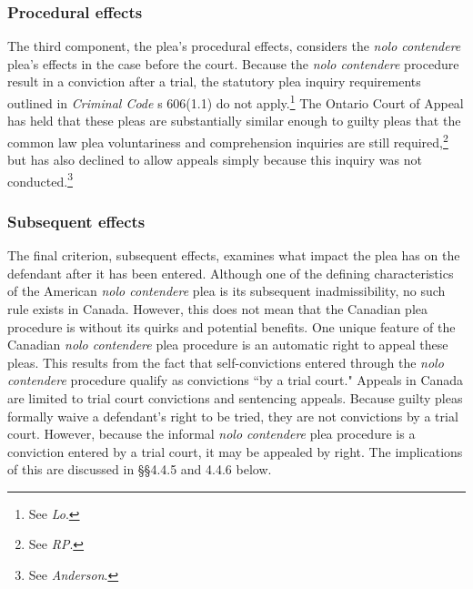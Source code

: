 \subsubsection{Procedural effects}

The third component, the plea's procedural effects, considers the \textit{nolo contendere} plea's effects in the case before the court. Because the \textit{nolo contendere} procedure result in a conviction after a trial, the statutory plea inquiry requirements outlined in \textit{Criminal Code} s 606(1.1) do not apply.\footnote{See \textit{Lo}.} The Ontario Court of Appeal has held that these pleas are substantially similar enough to guilty pleas that the common law plea voluntariness and comprehension inquiries are still required,\footnote{See \textit{RP}.} but has also declined to allow appeals simply because this inquiry was not conducted.\footnote{See \textit{Anderson}.} 

\subsubsection{Subsequent effects}

The final criterion, subsequent effects, examines what impact the plea has on the defendant after it has been entered. Although one of the defining characteristics of the American \textit{nolo contendere} plea is its subsequent inadmissibility, no such rule exists in Canada. However, this does not mean that the Canadian plea procedure is without its quirks and potential benefits. One unique feature of the Canadian \textit{nolo contendere} plea procedure is an automatic right to appeal these pleas. This results from the fact that self-convictions entered through the \textit{nolo contendere} procedure qualify as convictions ``by a trial court." Appeals in Canada are limited to trial court convictions and sentencing appeals. Because guilty pleas formally waive a defendant's right to be tried, they are not convictions by a trial court. However, because the informal \textit{nolo contendere} plea procedure is a conviction entered by a trial court, it may be appealed by right. The implications of this are discussed in \S\S 4.4.5 and 4.4.6 below.